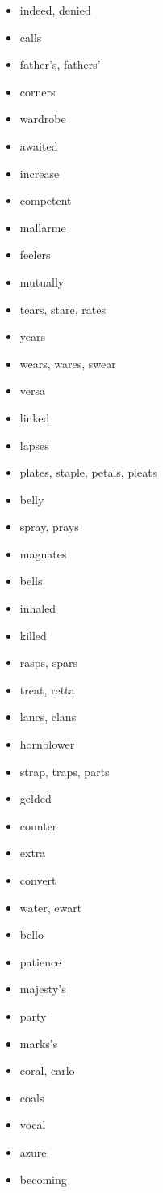 \documentclass{article}
\begin{document}
\begin{itemize}
    \item indeed, denied
    \item calls
    \item father's, fathers'
    \item corners
    \item wardrobe
    \item awaited
    \item increase
    \item competent
    \item mallarme
    \item feelers
    \item mutually
    \item tears, stare, rates
    \item years
    \item wears, wares, swear
    \item versa
    \item linked
    \item lapses
    \item plates, staple, petals, pleats
    \item belly
    \item spray, prays
    \item magnates
    \item bells
    \item inhaled
    \item killed
    \item rasps, spars
    \item treat, retta
    \item lancs, clans
    \item hornblower
    \item strap, traps, parts
    \item gelded
    \item counter
    \item extra
    \item convert
    \item water, ewart
    \item bello
    \item patience
    \item majesty's
    \item party
    \item marks's
    \item coral, carlo
    \item coals
    \item vocal
    \item azure
    \item becoming

\end{itemize}
\end{document}
